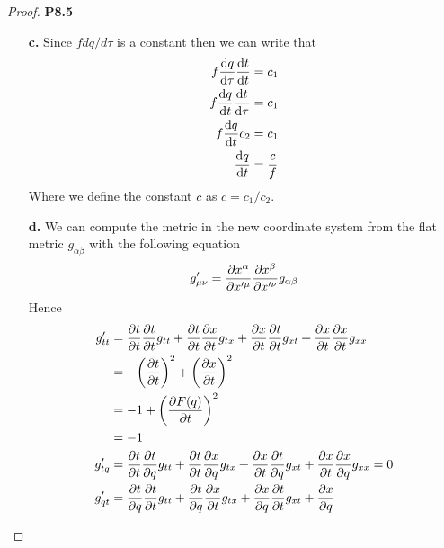 \documentclass[11pt]{article}
\theoremstyle{definition}
\begin{document}
\begin{proof}{\textbf{P8.5}}
\begin{itemize}
        \item[\textbf{c.}] Since $fdq/d\tau$ is a constant then we can write
        that
        \begin{align*}
            f\derivative{q}{\tau}\derivative{t}{t} &= c_1\\
            f\derivative{q}{t}\derivative{t}{\tau} &= c_1\\
            f\derivative{q}{t}c_2 &= c_1\\
            \derivative{q}{t} &= \frac{c}{f}
        \end{align*}
        Where we define the constant $c$ as $c = c_1/c_2$.

        \item[\textbf{d.}] We can compute the metric in the new coordinate
        system from the flat metric $g_{\alpha\beta}$ with the following
        equation
        \begin{align*}
            g'_{\mu\nu} = \partialderivative{x^\alpha}{x'^\mu}
            \partialderivative{x^\beta}{x'^\nu}g_{\alpha\beta}
        \end{align*}
        Hence
        \begin{align*}
            g'_{tt} &= \partialderivative{t}{t}
            \partialderivative{t}{t}g_{tt}
            + \partialderivative{t}{t}
            \partialderivative{x}{t}g_{tx}
            + \partialderivative{x}{t}
            \partialderivative{t}{t}g_{xt}
            + \partialderivative{x}{t}
            \partialderivative{x}{t}g_{xx}\\
            &= -\bigg(\partialderivative{t}{t}\bigg)^2
            + \bigg(\partialderivative{x}{t}\bigg)^2\\
            &= -1
            + \bigg(\partialderivative{F(q)}{t}\bigg)^2\\
            &= -1\\
            g'_{tq} &= \partialderivative{t}{t}
            \partialderivative{t}{q}g_{tt}
            + \partialderivative{t}{t}
            \partialderivative{x}{q}g_{tx}
            + \partialderivative{x}{t}
            \partialderivative{t}{q}g_{xt}
            + \partialderivative{x}{t}
            \partialderivative{x}{q}g_{xx}
            = 0\\
            g'_{qt} &= \partialderivative{t}{q}
            \partialderivative{t}{t}g_{tt}
            + \partialderivative{t}{q}
            \partialderivative{x}{t}g_{tx}
            + \partialderivative{x}{q}
            \partialderivative{t}{t}g_{xt}
            + \partialderivative{x}{q}

\end{align*}
\end{itemize}
\end{proof}
\end{document}
